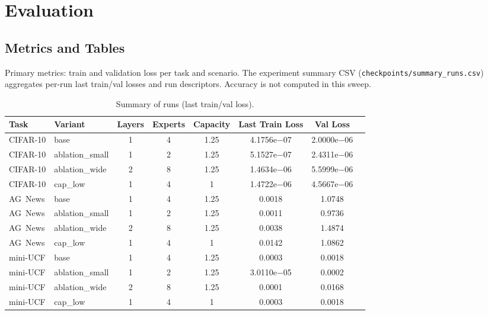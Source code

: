 \documentclass[11pt,a4paper]{article}
\newcommand{\CIFAR}{CIFAR-10}
\newcommand{\AGNEWS}{AG~News}
\newcommand{\MINIUCF}{mini-UCF}
\begin{document}
\section{Evaluation}
\subsection{Metrics and Tables}
Primary metrics: train and validation loss per task and scenario. The experiment summary CSV (\texttt{checkpoints/summary\_runs.csv}) aggregates per-run last train/val losses and run descriptors. Accuracy is not computed in this sweep.

\begin{table}[H]
\centering
\caption{Summary of runs (last train/val loss).}
\begin{tabularx}{\linewidth}{@{}l l c c c c c X@{}}
\toprule
Task & Variant & Layers & Experts & Capacity & Last Train Loss & Val Loss \\
\midrule
\CIFAR{} & base & 1 & 4 & 1.25 & 4.1756e$-$07 & 2.0000e$-$06 & \\
\CIFAR{} & ablation\_small & 1 & 2 & 1.25 & 5.1527e$-$07 & 2.4311e$-$06 & \\
\CIFAR{} & ablation\_wide & 2 & 8 & 1.25 & 1.4634e$-$06 & 5.5999e$-$06 & \\
\CIFAR{} & cap\_low & 1 & 4 & 1 & 1.4722e$-$06 & 4.5667e$-$06 & \\
\AGNEWS{} & base & 1 & 4 & 1.25 & 0.0018 & 1.0748 & \\
\AGNEWS{} & ablation\_small & 1 & 2 & 1.25 & 0.0011 & 0.9736 & \\
\AGNEWS{} & ablation\_wide & 2 & 8 & 1.25 & 0.0038 & 1.4874 & \\
\AGNEWS{} & cap\_low & 1 & 4 & 1 & 0.0142 & 1.0862 & \\
\MINIUCF{} & base & 1 & 4 & 1.25 & 0.0003 & 0.0018 & \\
\MINIUCF{} & ablation\_small & 1 & 2 & 1.25 & 3.0110e$-$05 & 0.0002 & \\
\MINIUCF{} & ablation\_wide & 2 & 8 & 1.25 & 0.0001 & 0.0168 & \\
\MINIUCF{} & cap\_low & 1 & 4 & 1 & 0.0003 & 0.0018 & \\
\bottomrule
\end{tabularx}
\end{table}
\end{document}

